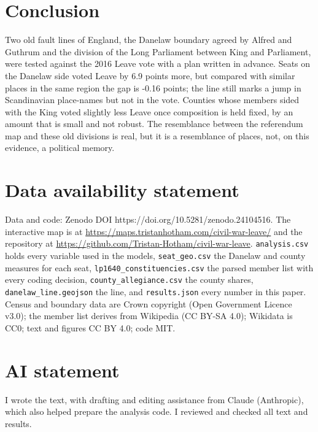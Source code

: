 \documentclass[11pt,a4paper]{article}
\begin{document}
\section{Conclusion}
Two old fault lines of England, the Danelaw boundary agreed by Alfred and Guthrum and the division of the Long Parliament between King and Parliament, were tested against the 2016 Leave vote with a plan written in advance. Seats on the Danelaw side voted Leave by 6.9 points more, but compared with similar places in the same region the gap is -0.16 points; the line still marks a jump in Scandinavian place-names but not in the vote. Counties whose members sided with the King voted slightly less Leave once composition is held fixed, by an amount that is small and not robust. The resemblance between the referendum map and these old divisions is real, but it is a resemblance of places, not, on this evidence, a political memory.

\section*{Data availability statement}
Data and code: Zenodo DOI https://doi.org/10.5281/zenodo.24104516. The interactive map is at \url{https://maps.tristanhotham.com/civil-war-leave/} and the repository at \url{https://github.com/Tristan-Hotham/civil-war-leave}. \texttt{analysis.csv} holds every variable used in the models, \texttt{seat\_geo.csv} the Danelaw and county measures for each seat, \texttt{lp1640\_constituencies.csv} the parsed member list with every coding decision, \texttt{county\_allegiance.csv} the county shares, \texttt{danelaw\_line.geojson} the line, and \texttt{results.json} every number in this paper. Census and boundary data are Crown copyright (Open Government Licence v3.0); the member list derives from Wikipedia (CC BY-SA 4.0); Wikidata is CC0; text and figures CC BY 4.0; code MIT.

\section*{AI statement}
I wrote the text, with drafting and editing assistance from Claude (Anthropic), which also helped prepare the analysis code. I reviewed and checked all text and results.




\appendix
\end{document}
